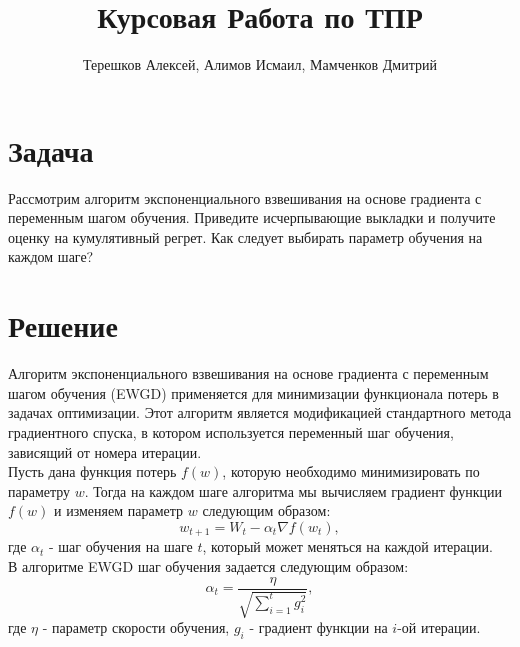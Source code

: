 \documentclass{article}
\title{Курсовая Работа по ТПР}
\author{Терешков Алексей, Алимов Исмаил, Мамченков Дмитрий}
\date{}
\begin{document}
\maketitle

\section{Задача}
Рассмотрим алгоритм экспоненциального взвешивания на основе градиента с переменным шагом обучения. Приведите исчерпывающие выкладки и получите оценку на кумулятивный регрет. Как следует выбирать параметр обучения на каждом шаге?

\section{Решение}
Алгоритм экспоненциального взвешивания на основе градиента с переменным шагом обучения (EWGD) применяется для минимизации функционала потерь в задачах оптимизации. Этот алгоритм является модификацией стандартного метода градиентного спуска, в котором используется переменный шаг обучения, зависящий от номера итерации. \\

Пусть дана функция потерь $f(w)$, которую необходимо минимизировать по параметру $w$. Тогда на каждом шаге алгоритма мы вычисляем градиент функции $f(w)$ и изменяем параметр $w$ следующим образом: \\
\[w_{t+1}=W_t-\alpha _t\nabla f(w_t),\]
где $\alpha _t$ - шаг обучения на шаге $t$, который может меняться на каждой итерации. \\

В алгоритме EWGD шаг обучения задается следующим образом:
\[\alpha _t = \frac{\eta}{\sqrt{\sum ^t_{i=1}g^2_i}},\]
где $\eta$ - параметр скорости обучения, $g_i$ - градиент функции на $i$-ой итерации. \\
\end{document}
